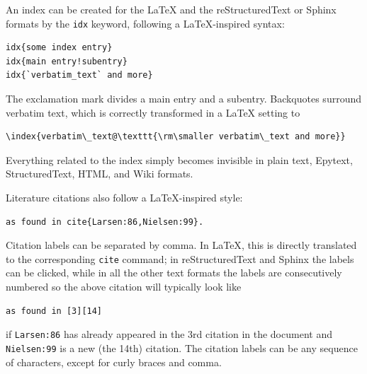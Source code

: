 \documentclass{article}
\begin{document}
An index can be created for the {\LaTeX} and the reStructuredText or
Sphinx formats by the {\fontsize{10pt}{10pt}\verb!idx!} keyword, following a {\LaTeX}-inspired syntax:
\begin{Verbatim}[fontsize=\fontsize{9pt}{9pt},tabsize=8,baselinestretch=0.85,
fontfamily=tt,xleftmargin=7mm]
idx{some index entry}
idx{main entry!subentry}
idx{`verbatim_text` and more}
\end{Verbatim}
\noindent
The exclamation mark divides a main entry and a subentry. Backquotes
surround verbatim text, which is correctly transformed in a {\LaTeX} setting to
\begin{Verbatim}[fontsize=\fontsize{9pt}{9pt},tabsize=8,baselinestretch=0.85,
fontfamily=tt,xleftmargin=7mm]
\index{verbatim\_text@\texttt{\rm\smaller verbatim\_text and more}}
\end{Verbatim}
\noindent
Everything related to the index simply becomes invisible in 
plain text, Epytext, StructuredText, HTML, and Wiki formats.

Literature citations also follow a {\LaTeX}-inspired style:
\begin{Verbatim}[fontsize=\fontsize{9pt}{9pt},tabsize=8,baselinestretch=0.85,
fontfamily=tt,xleftmargin=7mm]
as found in cite{Larsen:86,Nielsen:99}.
\end{Verbatim}
\noindent
Citation labels can be separated by comma. In {\LaTeX}, this is directly
translated to the corresponding {\fontsize{10pt}{10pt}\verb!cite!} command; in reStructuredText
and Sphinx the labels can be clicked, while in all the other text
formats the labels are consecutively numbered so the above citation
will typically look like
\begin{Verbatim}[fontsize=\fontsize{9pt}{9pt},tabsize=8,baselinestretch=0.85,
fontfamily=tt,xleftmargin=7mm]
as found in [3][14]
\end{Verbatim}
\noindent
if {\fontsize{10pt}{10pt}\verb!Larsen:86!} has already appeared in the 3rd citation in the document
and {\fontsize{10pt}{10pt}\verb!Nielsen:99!} is a new (the 14th) citation. The citation labels
can be any sequence of characters, except for curly braces and comma.
\end{document}
